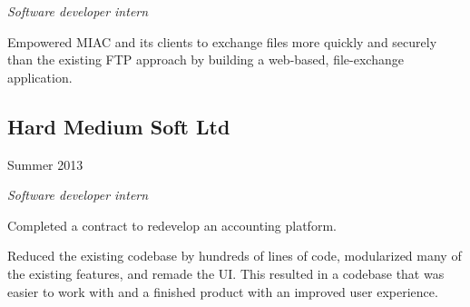 \emph{Software developer intern}

\begin{itemize}
  {\small
  \item Empowered MIAC and its clients to exchange files more quickly and
    securely than the existing FTP approach by building a web-based,
    file-exchange application.
  }
\end{itemize}

\noindent\begin{minipage}[t]{0.5\textwidth}
  \subsection*{Hard Medium Soft Ltd}
\end{minipage}
\noindent\begin{minipage}[t]{0.5\textwidth}
  \flushright
  Summer 2013
\end{minipage}

\emph{Software developer intern}

\begin{itemize}
  {\small
  \item Completed a contract to redevelop an accounting platform.
  \item Reduced the existing codebase by hundreds of lines of code, modularized
    many of the existing features, and remade the UI. This resulted in a
    codebase that was easier to work with and a finished product with an
    improved user experience.
  }
\end{itemize}

